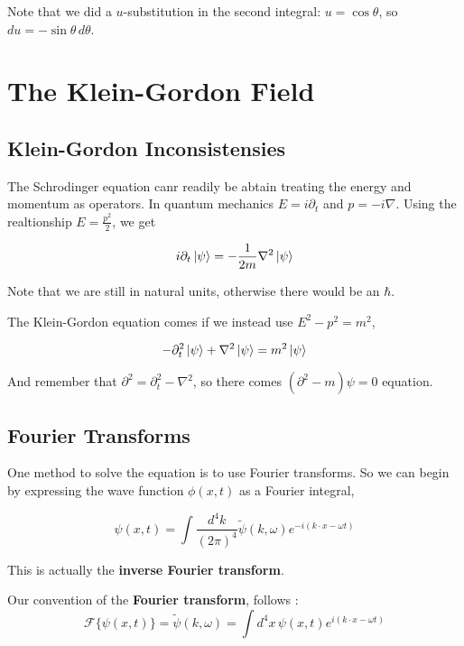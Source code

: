 Note that we did a $u$-substitution in the second integral: $u = \cos\theta$, so $du = -\sin\theta \, d\theta$.








\section{The Klein-Gordon Field}

\subsection{Klein-Gordon Inconsistensies}

The Schrodinger equation canr readily be abtain treating the energy and momentum as operators.
In quantum mechanics $E = i\partial_t$ and $p = -i\nabla$.
Using the realtionship $E = \frac{p^2}{2}$, we get


$$
i\partial_t \ket{\psi} = -\frac{1}{2m} \nabla^2 \ket{\psi}
$$

Note that we are still in natural units, otherwise there would be an $\hbar$.

The Klein-Gordon equation comes if we instead use $E^2 - p^2 = m^2$,

$$
-\partial_{t}^2 \ket{\psi} + \nabla^2 \ket{\psi} = m^2 \ket{\psi}
$$

And remember that $\partial^2 = \partial_{t}^{2} - \nabla^2$, so there comes $(\partial^2 - m)\psi = 0$ equation.



\subsection{Fourier Transforms} \label{section:fourier-properties}

One method to solve the equation is to use Fourier transforms.
So we can begin by expressing the wave function $\phi(x,t)$ as a Fourier integral,

$$
\psi(x, t) =
\int \frac{d^4k}{\left(2\pi\right)^4} \tilde{\psi}(k, \omega) e^{-i(k\cdot x - \omega t)}
$$

This is actually the \textbf{inverse Fourier transform}.

Our convention of the \textbf{Fourier transform}, follows \cite{peskin-and-schroeder}:
$$
\mathcal{F} \{ \psi(x, t) \} =
\tilde{ \psi }(k, \omega) =
\int d^4x \, \psi(x, t) e^{i(k\cdot x - \omega t)}
$$


